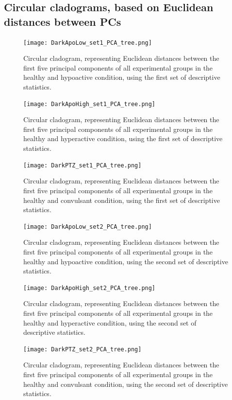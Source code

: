 \documentclass[a4paper,12pt]{article}
\begin{document}
\subsection{Circular cladograms, based on Euclidean distances between PCs}
\begin{figure}[h!]
\begin{center}
\texttt{[image: DarkApoLow\_set1\_PCA\_tree.png]}
\caption{Circular cladogram, representing Euclidean distances between the first five principal components of all experimental groups in the healthy and hypoactive condition, using the first set of descriptive statistics.}
\end{center}
\end{figure}
\begin{figure}[h!]
\begin{center}
\texttt{[image: DarkApoHigh\_set1\_PCA\_tree.png]}
\caption{Circular cladogram, representing Euclidean distances between the first five principal components of all experimental groups in the healthy and hyperactive condition, using the first set of descriptive statistics.}
\end{center}
\end{figure}
\begin{figure}[h!]
\begin{center}
\texttt{[image: DarkPTZ\_set1\_PCA\_tree.png]}
\caption{Circular cladogram, representing Euclidean distances between the first five principal components of all experimental groups in the healthy and convulsant condition, using the first set of descriptive statistics.}
\end{center}
\end{figure}

\begin{figure}[h!]
\begin{center}
\texttt{[image: DarkApoLow\_set2\_PCA\_tree.png]}
\caption{Circular cladogram, representing Euclidean distances between the first five principal components of all experimental groups in the healthy and hypoactive condition, using the second set of descriptive statistics.}
\end{center}
\end{figure}
\begin{figure}[h!]
\begin{center}
\texttt{[image: DarkApoHigh\_set2\_PCA\_tree.png]}
\caption{Circular cladogram, representing Euclidean distances between the first five principal components of all experimental groups in the healthy and hyperactive condition, using the second set of descriptive statistics.}
\end{center}
\end{figure}
\begin{figure}[h!]
\begin{center}
\texttt{[image: DarkPTZ\_set2\_PCA\_tree.png]}
\caption{Circular cladogram, representing Euclidean distances between the first five principal components of all experimental groups in the healthy and convulsant condition, using the second set of descriptive statistics.}
\end{center}
\end{figure}
\end{document}
